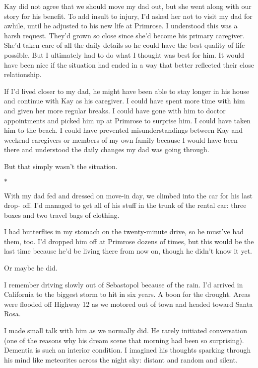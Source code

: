 \documentclass[12pt]{book}
\begin{document}
Kay did not agree that we should move my dad out, but she went along with our story for his benefit. To add insult to injury, I'd asked her not to visit my dad for awhile, until he adjusted to his new life at Primrose. I understood this was a harsh request. They'd grown so close since she'd become his primary caregiver. She'd taken care of all the daily details so he could have the best quality of life possible. But I ultimately had to do what I thought was best for him. It would have been nice if the situation had ended in a way that better reflected their close relationship.

If I'd lived closer to my dad, he might have been able to stay longer in his house and continue with Kay as his caregiver. I could have spent more time with him and given her more regular breaks. I could have gone with him to doctor appointments and picked him up at Primrose to surprise him. I could have taken him to the beach. I could have prevented misunderstandings between Kay and weekend caregivers or members of my own family because I would have been there and understood the daily changes my dad was going through.

But that simply wasn't the situation.

\begin{center}$*$\end{center}

With my dad fed and dressed on move-in day, we climbed into the car for his last drop- off. I'd managed to get all of his stuff in the trunk of the rental car: three boxes and two travel bags of clothing.

I had butterflies in my stomach on the twenty-minute drive, so he must've had them, too. I'd dropped him off at Primrose dozens of times, but this would be the last time because he'd be living there from now on, though he didn't know it yet.

Or maybe he did.

I remember driving slowly out of Sebastopol because of the rain. I'd arrived in California to the biggest storm to hit in six years. A boon for the drought. Areas were flooded off Highway 12 as we motored out of town and headed toward Santa Rosa.

I made small talk with him as we normally did. He rarely initiated conversation (one of the reasons why his dream scene that morning had been so surprising). Dementia is such an interior condition. I imagined his thoughts sparking through his mind like meteorites across the night sky: distant and random and silent.
\end{document}
